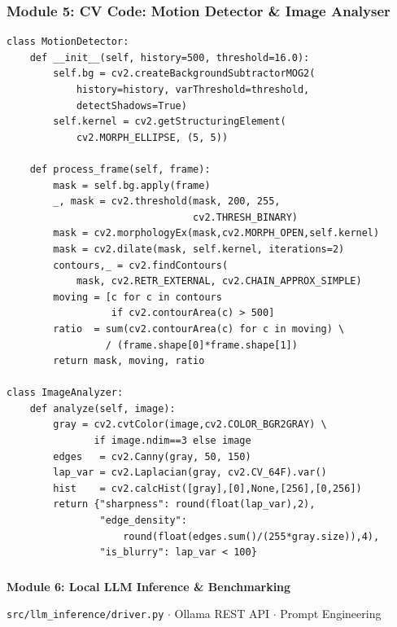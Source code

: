 \begin{frame}[fragile]\frametitle{Module 5: CV Code: Motion Detector \& Image Analyser}
\begin{lstlisting}
class MotionDetector:
    def __init__(self, history=500, threshold=16.0):
        self.bg = cv2.createBackgroundSubtractorMOG2(
            history=history, varThreshold=threshold,
            detectShadows=True)
        self.kernel = cv2.getStructuringElement(
            cv2.MORPH_ELLIPSE, (5, 5))

    def process_frame(self, frame):
        mask = self.bg.apply(frame)
        _, mask = cv2.threshold(mask, 200, 255,
                                cv2.THRESH_BINARY)
        mask = cv2.morphologyEx(mask,cv2.MORPH_OPEN,self.kernel)
        mask = cv2.dilate(mask, self.kernel, iterations=2)
        contours,_ = cv2.findContours(
            mask, cv2.RETR_EXTERNAL, cv2.CHAIN_APPROX_SIMPLE)
        moving = [c for c in contours
                  if cv2.contourArea(c) > 500]
        ratio  = sum(cv2.contourArea(c) for c in moving) \
                 / (frame.shape[0]*frame.shape[1])
        return mask, moving, ratio

class ImageAnalyzer:
    def analyze(self, image):
        gray = cv2.cvtColor(image,cv2.COLOR_BGR2GRAY) \
               if image.ndim==3 else image
        edges   = cv2.Canny(gray, 50, 150)
        lap_var = cv2.Laplacian(gray, cv2.CV_64F).var()
        hist    = cv2.calcHist([gray],[0],None,[256],[0,256])
        return {"sharpness": round(float(lap_var),2),
                "edge_density":
                    round(float(edges.sum()/(255*gray.size)),4),
                "is_blurry": lap_var < 100}
\end{lstlisting}
\end{frame}

\begin{frame}[fragile]\frametitle{}
\begin{center}
{\Large \textbf{Module 6: Local LLM Inference \& Benchmarking}}\

\texttt{src/llm\_inference/driver.py} $\cdot$ Ollama REST API $\cdot$ Prompt Engineering
\end{center}
\end{frame}

